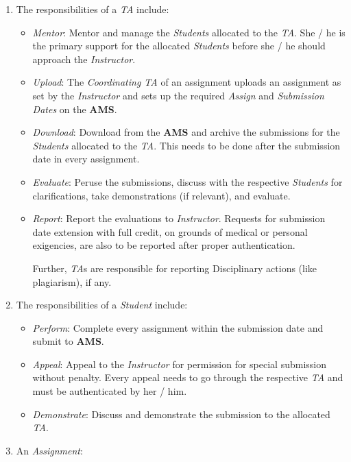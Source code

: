 \documentclass{article}
\begin{document}
\begin{enumerate}
\begin{enumerate}
\item The responsibilities of a {\em TA} include:

\begin{itemize}
\item {\em Mentor}: Mentor and manage the {\em Students} allocated to the {\em TA}. She / he is the primary support for the allocated {\em Students} before she / he should approach the {\em Instructor}.
\item {\em Upload}: The {\em Coordinating TA} of an assignment uploads an assignment as set by the {\em Instructor} and sets up the required {\em Assign} and {\em Submission Dates} on the {\bf AMS}. 
\item {\em Download}: Download from the {\bf AMS} and archive the submissions for the {\em Students} allocated to the {\em TA}. This needs to be done after the submission date in every assignment.
\item {\em Evaluate}: Peruse the submissions, discuss with the respective {\em Students} for clarifications, take demonstrations (if relevant), and evaluate.
\item {\em Report}: Report the evaluations to {\em Instructor}. Requests for submission date extension with full credit, on grounds of medical or personal exigencies, are also to be reported after proper authentication. 

Further, {\em TA}s are responsible for reporting Disciplinary actions (like plagiarism), if any.
\end{itemize}

\item The responsibilities of a {\em Student} include:

\begin{itemize}
\item {\em Perform}: Complete every assignment within the submission date and submit to {\bf AMS}.
\item {\em Appeal}: Appeal to the {\em Instructor} for permission for special submission without penalty. Every appeal needs to go through the respective {\em TA} and must be authenticated by her / him.
\item {\em Demonstrate}: Discuss and demonstrate the submission to the allocated {\em TA}.
\end{itemize}

\item An {\em Assignment}:


\end{enumerate}
\end{enumerate}
\end{document}
